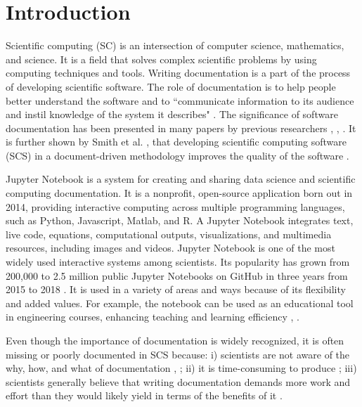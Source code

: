\chapter{Introduction} \label{chap:intro}
Scientific computing (SC) is an intersection of computer science, mathematics, 
and science. It is a field that solves complex scientific problems by using 
computing techniques and tools. Writing documentation is a part of the process 
of developing scientific software. The role of documentation is to help 
people better understand the software and to ``communicate information to its 
audience and instil knowledge of the system it describes" 
\cite{forward2002software}. The significance of software documentation has 
been presented in many papers by previous researchers \cite{parnas2011precise}, 
\cite{chomal2014significance}, \cite{kipyegen2013importance}. It is further 
shown by Smith et al. \cite{SmithandKoothoor2016}, \cite{SmithandYu2007} that 
developing scientific computing software (SCS) in a document-driven methodology 
improves the quality of the software . 

Jupyter Notebook is a system for creating and sharing data science and 
scientific computing documentation. It is a nonprofit, open-source application 
born out in 2014, providing interactive computing across multiple programming 
languages, such as Python, Javascript, Matlab, and R. A Jupyter Notebook 
integrates text, live code, equations, computational outputs, visualizations, 
and multimedia resources, including images and videos. Jupyter Notebook is one 
of the most widely used interactive systems among scientists. Its popularity 
has grown from 200,000 to 2.5 million public Jupyter Notebooks on GitHub in 
three years from 2015 to 2018 \cite{Jeffrey2018}. It is used in a variety of 
areas and ways because of its flexibility and added values. For example, the 
notebook can be used as an educational tool in engineering courses, enhancing 
teaching and learning efficiency \cite{cardoso2019using}, \cite{zhao2019use}.

Even though the importance of documentation is widely recognized, it is often 
missing or poorly documented in SCS because: i) scientists are not aware of 
the why, how, and what of documentation \cite{hermann2022documenting}, 
\cite{chang2022understanding}; ii) it is time-consuming to produce 
\cite{sanders2008dealing}; iii) scientists generally believe that writing 
documentation demands more work and effort than they would likely yield in 
terms of the benefits of it \cite{smith2016advantages}.

